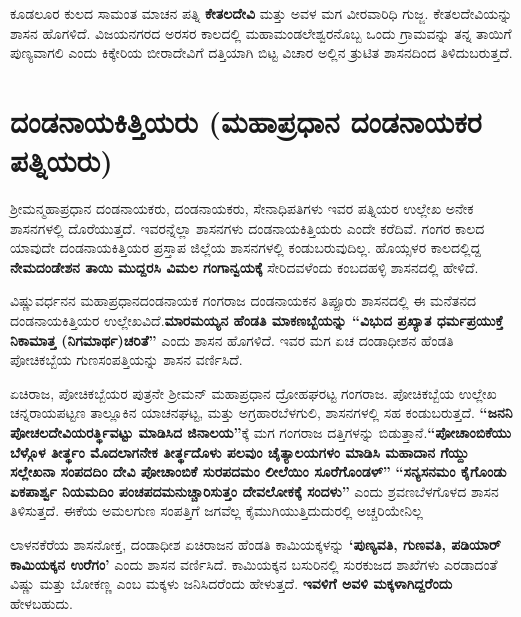 ಕೂಡಲೂರ ಕುಲದ ಸಾಮಂತ ಮಾಚನ ಪತ್ನಿ \textbf{ಕೇತಲದೇವಿ} ಮತ್ತು ಅವಳ ಮಗ ವೀರವಾರಿಧಿ ಗುಜ್ಜ. ಕೇತಲದೇವಿಯನ್ನು ಶಾಸನ ಹೊಗಳಿದೆ. ವಿಜಯನಗರದ ಅರಸರ ಕಾಲದಲ್ಲಿ ಮಹಾಮಂಡಲೇಶ್ವರನೊಬ್ಬ ಒಂದು ಗ್ರಾಮವನ್ನು ತನ್ನ ತಾಯಿಗೆ ಪುಣ್ಯವಾಗಲಿ ಎಂದು ಕಿಕ್ಕೇರಿಯ ಬೀರಾದೇವಿಗೆ ದತ್ತಿಯಾಗಿ ಬಿಟ್ಟ ವಿಚಾರ ಅಲ್ಲಿನ ತ್ರುಟಿತ ಶಾಸನದಿಂದ ತಿಳಿದುಬರುತ್ತದೆ.


\section{ದಂಡನಾಯಕಿತ್ತಿಯರು (ಮಹಾಪ್ರಧಾನ ದಂಡನಾಯಕರ ಪತ್ನಿಯರು)}

ಶ‍್ರೀಮನ್ಮಹಾಪ್ರಧಾನ ದಂಡನಾಯಕರು, ದಂಡನಾಯಕರು, ಸೇನಾಧಿಪತಿಗಳು ಇವರ ಪತ್ನಿಯರ ಉಲ್ಲೇಖ ಅನೇಕ ಶಾಸನಗಳಲ್ಲಿ ದೊರೆಯುತ್ತದೆ. ಇವರನ್ನೆಲ್ಲಾ ಶಾಸನಗಳು ದಂಡನಾಯಕಿತ್ತಿಯರು ಎಂದೇ ಕರೆದಿವೆ. ಗಂಗರ ಕಾಲದ ಯಾವುದೇ ದಂಡನಾಯಕಿತ್ತಿಯರ ಪ್ರಸ್ತಾಪ ಜಿಲ್ಲೆಯ ಶಾಸನಗಳಲ್ಲಿ ಕಂಡುಬರುವುದಿಲ್ಲ. ಹೊಯ್ಸಳರ ಕಾಲದಲ್ಲಿದ್ದ \textbf{ನೇಮದಂಡೇಶನ ತಾಯಿ ಮುದ್ದರಸಿ ವಿಮಲ ಗಂಗಾನ್ವಯಕ್ಕೆ} ಸೇರಿದವಳೆಂದು ಕಂಬದಹಳ್ಳಿ ಶಾಸನದಲ್ಲಿ ಹೇಳಿದೆ.

ವಿಷ್ಣುವರ್ಧನನ ಮಹಾಪ್ರಧಾನದಂಡನಾಯಕ ಗಂಗರಾಜ ದಂಡನಾಯಕನ ತಿಪ್ಪೂರು ಶಾಸನದಲ್ಲಿ ಈ ಮನೆತನದ ದಂಡನಾಯಕಿತ್ತಿಯರ ಉಲ್ಲೇಖವಿದೆ.\textbf{ಮಾರಮಯ್ಯನ ಹೆಂಡತಿ ಮಾಕಣಬ್ಬೆಯನ್ನು “ವಿಭುದ ಪ್ರಖ್ಯಾತ ಧರ್ಮಪ್ರಯುಕ್ತೆ ನಿಕಾಮಾತ್ತ (ನಿಗಮಾರ್ಥ)ಚರಿತೆ”} ಎಂದು ಶಾಸನ ಹೊಗಳಿದೆ. ಇವರ ಮಗ ಏಚ ದಂಡಾಧೀಶನ ಹೆಂಡತಿ ಪೋಚಿಕಬ್ಬೆಯ ಗುಣಸಂಪತ್ತಿಯನ್ನು ಶಾಸನ ವರ್ಣಿಸಿದೆ.

ಏಚಿರಾಜ, ಪೋಚಿಕಬ್ಬೆಯರ ಪುತ್ರನೇ ಶ‍್ರೀಮನ್​ ಮಹಾಪ್ರಧಾನ ದ್ರೋಹಘರಟ್ಟ ಗಂಗರಾಜ. ಪೋಚಿಕಬ್ಬೆಯ ಉಲ್ಲೇಖ ಚನ್ನರಾಯಪಟ್ಟಣ ತಾಲ್ಲೂಕಿನ ಯಾಚನಘಟ್ಟ, ಮತ್ತು ಅಗ್ರಹಾರಬೆಳಗುಲಿ, ಶಾಸನಗಳಲ್ಲಿ ಸಹ ಕಂಡುಬರುತ್ತದೆ. \textbf{“ಜನನಿ ಪೋಚಲದೇವಿಯರರ್ತ್ಥಿವಟ್ಟು ಮಾಡಿಸಿದ ಜಿನಾಲಯ”}ಕ್ಕೆ ಮಗ ಗಂಗರಾಜ ದತ್ತಿಗಳನ್ನು ಬಿಡುತ್ತಾನೆ.\break \textbf{“ಪೋಚಾಂಬಿಕೆಯು ಬೆಳ್ಗೊಳ ತೀರ್ತ್ಥಂ ಮೊದಲಾಗನೇಕ ತೀರ್ತ್ಥದೊಳು ಪಲವುಂ ಚೈತ್ಯಾಲಯಗಳಂ ಮಾಡಿಸಿ ಮಹಾದಾನ ಗೆಯ್ದು ಸಲ್ಲೇಖನಾ ಸಂಪದದಿಂ ದೇವಿ ಪೋಚಾಂಬಿಕೆ ಸುರಪದಮಂ ಲೀಲೆಯಿಂ ಸೂರೆಗೊಂಡಳ್​”} \textbf{“ಸನ್ಯಸನಮಂ ಕೈಗೊಂಡು ಏಕಪಾರ್ಶ್ವ ನಿಯಮದಿಂ ಪಂಚಪದಮನುಚ್ಚಾರಿಸುತ್ತಂ ದೇವಲೋಕಕ್ಕೆ ಸಂದಳು”} ಎಂದು ಶ್ರವಣಬೆಳಗೊಳದ ಶಾಸನ ತಿಳಿಸುತ್ತದೆ. ಈಕೆಯ ಅಮಲಗುಣ ಸಂಪತ್ತಿಗೆ ಜಗವೆಲ್ಲ ಕೈಮುಗಿಯುತ್ತಿದುದುರಲ್ಲಿ ಅಚ್ಚರಿಯೇನಿಲ್ಲ

ಲಾಳನಕೆರೆಯ ಶಾಸನೋಕ್ತ, ದಂಡಾಧೀಶ ಏಚಿರಾಜನ ಹೆಂಡತಿ ಕಾಮಿಯಕ್ಕಳನ್ನು \textbf{‘ಪುಣ್ಯವತಿ, ಗುಣವತಿ, ಪಡಿಯಾರ್​ ಕಾಮಿಯಕ್ಕನ ಉರೆಗಂ’} ಎಂದು ಶಾಸನ ವರ್ಣಿಸಿದೆ. ಕಾಮಿಯಕ್ಕನ ಬಸುರಿನಲ್ಲಿ ಸುರಕುಜದ ಶಾಖೆಗಳು ಎರಡಾದಂತೆ ವಿಷ್ಣು ಮತ್ತು ಬೋಕಣ್ಣ ಎಂಬ ಮಕ್ಕಳು ಜನಿಸಿದರೆಂದು ಹೇಳುತ್ತದೆ. \textbf{ಇವಳಿಗೆ ಅವಳಿ ಮಕ್ಕಳಾಗಿದ್ದರೆಂದು} ಹೇಳಬಹುದು.

